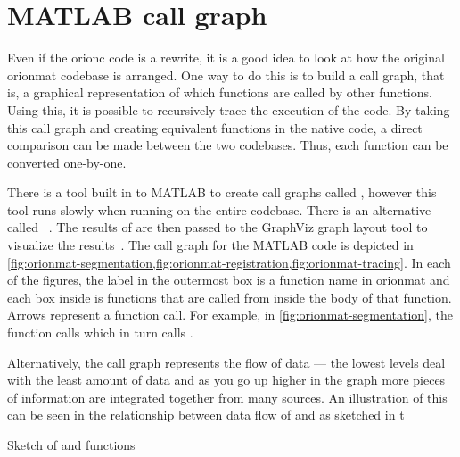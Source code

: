 \section{ MATLAB call graph}\label{appx:matlab-call-graph}

Even if the \gls{orionc} code is a rewrite, it is a good idea to look at how
the original \gls{orionmat} codebase is arranged.  One way to do this is to
build a call graph, that is, a graphical representation of which functions are
called by other functions. Using this, it is possible to recursively trace the
execution of the code. By taking this call graph and creating equivalent
functions in the native code, a direct comparison can be made between the two
codebases. Thus, each function can be converted one-by-one.

There is a tool built in to MATLAB to create call graphs called
, %
however this tool runs slowly when running on the entire codebase.
There is an alternative called ~\autocite{MATLAB:fdep}. The
results of  are then passed to the GraphViz graph layout
tool to visualize the results~\autocite{GraphViz:Gansner:2000}.
The call graph for the MATLAB code is depicted in \cref{fig:orionmat-segmentation,fig:orionmat-registration,fig:orionmat-tracing}.
In each of the figures, the label in the outermost box is a function name in
\gls{orionmat} and each box inside is functions that are called from inside the
body of that function. Arrows represent a function call. For example, in
\cref{fig:orionmat-segmentation}, the 
function calls  which in turn calls
.

Alternatively, the call graph represents the flow of data --- the lowest levels
deal with the least amount of data and as you go up higher in the graph more
pieces of information are integrated together from many sources.
An illustration of this can be seen in the relationship between 
data flow of  and
 as sketched in t %

\begin{algorithm}
	\caption{Sketch of  and
		 functions
	}\label{alg:dataflow_example}
	\begin{algorithmic}[1]
		\EndFunction
			\EndFor
		\EndFunction
	\end{algorithmic}
\end{algorithm}

